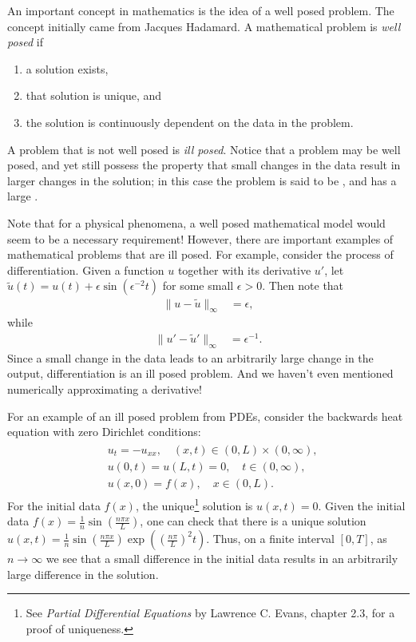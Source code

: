 \label{lab:inverse_problems}

An important concept in mathematics is the idea of a well posed problem.
The concept initially came from Jacques Hadamard.
A mathematical problem is \textit{well posed} if 
\begin{enumerate}
	\item a solution exists, 
	\item that solution is unique, and 
	\item the solution is continuously dependent on the data in the problem.
\label{inverse_problems:continuous_dependence}
\end{enumerate}
A problem that is not well posed is \textit{ill posed}.
Notice that a problem may be well posed, and yet still possess the property that small changes in the data result in larger changes in the solution; in this case the problem is said to be , and has a large .

Note that for a physical phenomena, a well posed mathematical model would seem to be a necessary requirement!
However, there are important examples of mathematical problems that are ill posed.
For example, consider the process of differentiation.
Given a function $u$ together with its derivative $u'$, let $\tilde{u}(t) = u(t) +  \epsilon \sin(\epsilon^{-2}t)$ for some small $\epsilon > 0$.
Then note that 
\begin{align*}
	\|u-\tilde{u}\|_{\infty} &= \epsilon,
\end{align*}
while
\begin{align*}
	\|u'-\tilde{u}'\|_{\infty} &= \epsilon^{-1}.
\end{align*}
Since a small change in the data leads to an arbitrarily large change in the output, differentiation is an ill posed problem.
And we haven't even mentioned numerically approximating a derivative!

For an example of an ill posed problem from PDEs, consider the backwards heat equation with zero Dirichlet conditions: 
\begin{align}
\begin{split}
	&{} u_t = -u_{xx}, \quad (x,t) \in (0,L)\times (0,\infty),\\
	&{} u(0,t) = u(L,t) = 0, \quad t \in (0,\infty),\\
	&{} u(x,0) = f(x), \quad x \in (0,L).
\end{split}
\end{align}
For the initial data $f(x)$, the unique\footnote{See \textit{Partial Differential Equations} by Lawrence C. Evans, chapter 2.3, for a proof of uniqueness.} solution is $u(x,t) = 0.$ 
Given the initial data $f(x) = \frac{1}{n}\sin ( \frac{n \pi x}{L})$, one can check that there is a unique solution $u(x,t) = \frac{1}{n}\sin ( \frac{n \pi x}{L})\exp ( (\frac{n \pi }{L})^2 t)$. 
Thus, on a finite interval $[0,T]$, as $n \to \infty$ we see that a small difference in the initial data results in an arbitrarily large difference in the solution.

